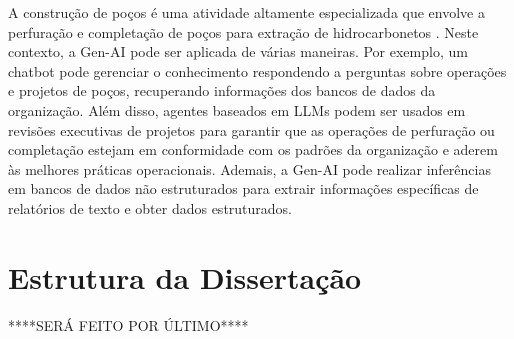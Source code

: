 A construção de poços é uma atividade altamente especializada que envolve a perfuração e completação de poços para extração de hidrocarbonetos \cite{Thomas2004}. Neste contexto, a Gen-AI pode ser aplicada de várias maneiras. Por exemplo, um chatbot pode gerenciar o conhecimento respondendo a perguntas sobre operações e projetos de poços, recuperando informações dos bancos de dados da organização. Além disso, agentes baseados em LLMs podem ser usados em revisões executivas de projetos para garantir que as operações de perfuração ou completação estejam em conformidade com os padrões da organização e aderem às melhores práticas operacionais. Ademais, a Gen-AI pode realizar inferências em bancos de dados não estruturados para extrair informações específicas de relatórios de texto e obter dados estruturados.

\section{Estrutura da Dissertação}

****SERÁ FEITO POR ÚLTIMO****
